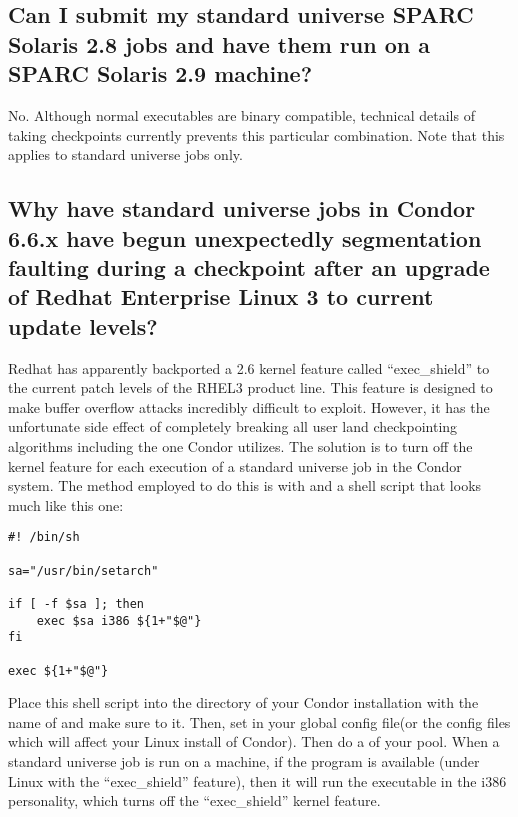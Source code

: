 \subsection*{Can I submit my standard universe SPARC Solaris 2.8 jobs and have them run on a SPARC Solaris 2.9 machine?}

No.  Although normal executables are binary compatible, technical details
of taking checkpoints currently prevents this particular combination.
Note that this applies to standard universe jobs only.

\subsection*{Why have standard universe jobs in Condor 6.6.x have begun unexpectedly segmentation faulting during a checkpoint after an upgrade of Redhat Enterprise Linux 3 to current update levels?}

Redhat has apparently backported a 2.6 kernel feature called
``exec\_shield'' to the current patch levels of the RHEL3 product line. 
This feature is designed to make buffer overflow attacks incredibly difficult
to exploit. 
However, it has the unfortunate side effect of completely breaking all
user land checkpointing algorithms including the one Condor utilizes.
The solution is to turn off the kernel feature for each execution of a 
standard universe job in the Condor system.
The method employed to do this is with  and a shell
script that looks much like this one:

\begin{verbatim}
#! /bin/sh

sa="/usr/bin/setarch"

if [ -f $sa ]; then
    exec $sa i386 ${1+"$@"}
fi

exec ${1+"$@"}
\end{verbatim}

Place this shell script into the  directory of your Condor
installation with the name of  and make sure to 
 it. 
Then, set  in your
global config file(or the config files which will affect your Linux install
of Condor).
Then do a  of your pool.
When a standard universe job is run on a machine, if the  
program is available (under Linux with the ``exec\_shield'' feature), then it
will run the executable in the i386 personality, which turns off the 
``exec\_shield'' kernel feature.


